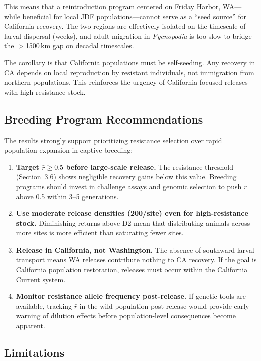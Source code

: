 \documentclass[11pt,a4paper]{article}
\newcommand{\rbar}{\ensuremath{\bar{r}}}
\begin{document}
This means that a reintroduction program centered on Friday Harbor, WA---while beneficial for local JDF populations---cannot serve as a ``seed source'' for California recovery. The two regions are effectively isolated on the timescale of larval dispersal (weeks), and adult migration in \textit{Pycnopodia} is too slow to bridge the $>$1500\,km gap on decadal timescales.

The corollary is that California populations must be self-seeding. Any recovery in CA depends on local reproduction by resistant individuals, not immigration from northern populations. This reinforces the urgency of California-focused releases with high-resistance stock.

\subsection{Breeding Program Recommendations}

The results strongly support prioritizing resistance selection over rapid population expansion in captive breeding:

\begin{enumerate}[nosep]
  \item \textbf{Target $\rbar \geq 0.5$ before large-scale release.} The resistance threshold (Section~3.6) shows negligible recovery gains below this value. Breeding programs should invest in challenge assays and genomic selection to push $\rbar$ above 0.5 within 3--5 generations.
  
  \item \textbf{Use moderate release densities (200/site) even for high-resistance stock.} Diminishing returns above D2 mean that distributing animals across more sites is more efficient than saturating fewer sites.
  
  \item \textbf{Release in California, not Washington.} The absence of southward larval transport means WA releases contribute nothing to CA recovery. If the goal is California population restoration, releases must occur within the California Current system.
  
  \item \textbf{Monitor resistance allele frequency post-release.} If genetic tools are available, tracking $\rbar$ in the wild population post-release would provide early warning of dilution effects before population-level consequences become apparent.
\end{enumerate}

\subsection{Limitations}
\end{document}
